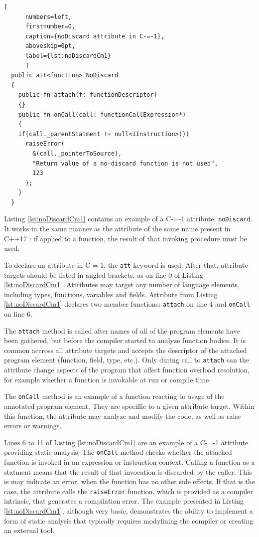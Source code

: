\begin{minipage}{\linewidth}

	\begin{lstlisting}[
	  numbers=left,
	  firstnumber=0,
	  caption={noDiscard attribute in C-=-1},
	  aboveskip=0pt,
	  label={lst:noDiscardCm1}
	  ]
  public att<function> NoDiscard
  {
	public fn attach(f: functionDescriptor)
	{}
	public fn onCall(call: functionCallExpression*)
	{
	if(call._parentStatment != null<IInstruction>())
	  raiseError(
		&(call._pointerToSource),
		"Return value of a no-discard function is not used",
		123
	  );
	}
  }
  \end{lstlisting}
\end{minipage}

Listing \ref{lst:noDiscardCm1} contains an example of a C-=-1 attribute: \lstinline{noDiscard}.
It works in the same manner as the attribute of the same name present in C++17 \cite{ISO:cpp17}: if applied to a function, the result of that invoking procedure must be used.

To declare an attribute in C-=-1, the \lstinline{att} keyword is used.
After that, attribute targets should be listed in angled brackets, as on line 0 of Listing \ref{lst:noDiscardCm1}.
Attributes may target any number of language elements, including types, functions, variables and fields.
Attribute from Listing \ref{lst:noDiscardCm1} declares two member functions: \lstinline{attach} on line 4 and \lstinline{onCall} on line 6.

The \lstinline{attach} method is called after names of all of the program elements have been gathered, but before the compiler started to analyze function bodies.
It is common accross all attribute targets and accepts the descriptor of the attached program element (function, field, type, etc.).
Only during call to \lstinline{attach} can the attribute change aspects of the program that affect function overload resolution, for example
whether a function is invokable at run or compile time.

The \lstinline{onCall} method is an example of a function reacting to usage of the annotated program element.
They are speciffic to a given attribute target.
Within this function, the attribute may analyze and modify the code, as well as raise errors or warnings.

Lines 6 to 11 of Listing \ref{lst:noDiscardCm1} are an example of a C-=-1 attribute providing static analysis.
The \lstinline{onCall} method checks whether the attached function is invoked in an expression or instruction context.
Calling a function as a statment means that the result of that invocation is discarded by the caller.
This is may indicate an error, when the function has no other side effects.
If that is the case, the attribute calls the \lstinline{raiseError} function, which is provided as a compiler intrinsic, that generates a compilation error.
The example presented in Listing \ref{lst:noDiscardCm1}, although very basic, demonstrates the ability to implement a form of static analysis that typically requires modyfining the compiler or creating an external tool.

